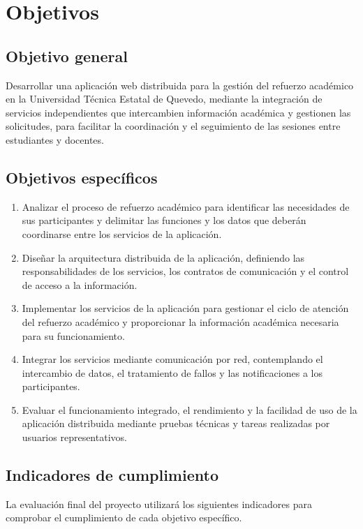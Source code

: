 \section{Objetivos}
\subsection{Objetivo general}

Desarrollar una aplicación web distribuida para la gestión del refuerzo académico en la Universidad Técnica Estatal de Quevedo, mediante la integración de servicios independientes que intercambien información académica y gestionen las solicitudes, para facilitar la coordinación y el seguimiento de las sesiones entre estudiantes y docentes.

\subsection{Objetivos específicos}

\begin{enumerate}
\item Analizar el proceso de refuerzo académico para identificar las necesidades de sus participantes y delimitar las funciones y los datos que deberán coordinarse entre los servicios de la aplicación.
\item Diseñar la arquitectura distribuida de la aplicación, definiendo las responsabilidades de los servicios, los contratos de comunicación y el control de acceso a la información.
\item Implementar los servicios de la aplicación para gestionar el ciclo de atención del refuerzo académico y proporcionar la información académica necesaria para su funcionamiento.
\item Integrar los servicios mediante comunicación por red, contemplando el intercambio de datos, el tratamiento de fallos y las notificaciones a los participantes.
\item Evaluar el funcionamiento integrado, el rendimiento y la facilidad de uso de la aplicación distribuida mediante pruebas técnicas y tareas realizadas por usuarios representativos.
\end{enumerate}

\subsection{Indicadores de cumplimiento}

La evaluación final del proyecto utilizará los siguientes indicadores para comprobar el cumplimiento de cada objetivo específico.

